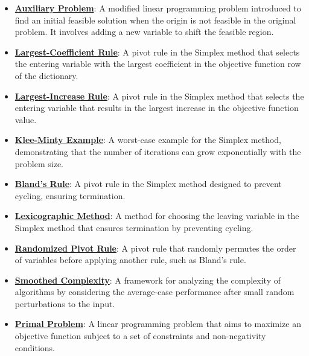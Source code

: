 \documentclass{article}%
\begin{document}
\begin{itemize}[leftmargin=*]
\item \href{https://www.math.purdue.edu/~yipn/421/2024-08-27-ExSimplex.pdf#page=32}{\textbf{Auxiliary Problem}}: A modified linear programming problem introduced to find an initial feasible solution when the origin is not feasible in the original problem. It involves adding a new variable to shift the feasible region.%
\item \href{https://www.math.purdue.edu/~yipn/421/2024-09-05-SimplexEfficiency.pdf#page=4}{\textbf{Largest-Coefficient Rule}}: A pivot rule in the Simplex method that selects the entering variable with the largest coefficient in the objective function row of the dictionary.%
\item \href{https://www.math.purdue.edu/~yipn/421/2024-09-05-SimplexEfficiency.pdf#page=6}{\textbf{Largest-Increase Rule}}: A pivot rule in the Simplex method that selects the entering variable that results in the largest increase in the objective function value.%
\item \href{https://www.math.purdue.edu/~yipn/421/2024-09-05-SimplexEfficiency.pdf#page=2}{\textbf{Klee-Minty Example}}: A worst-case example for the Simplex method, demonstrating that the number of iterations can grow exponentially with the problem size.%
\item \href{https://www.math.purdue.edu/~yipn/421/2024-09-05-SimplexEfficiency.pdf#page=10}{\textbf{Bland's Rule}}: A pivot rule in the Simplex method designed to prevent cycling, ensuring termination.%
\item \href{https://www.math.purdue.edu/~yipn/421/2024-09-05-SimplexEfficiency.pdf#page=10}{\textbf{Lexicographic Method}}: A method for choosing the leaving variable in the Simplex method that ensures termination by preventing cycling.%
\item \href{https://www.math.purdue.edu/~yipn/421/2024-09-05-SimplexEfficiency.pdf#page=10}{\textbf{Randomized Pivot Rule}}: A pivot rule that randomly permutes the order of variables before applying another rule, such as Bland's rule.%
\item \href{https://www.math.purdue.edu/~yipn/421/2024-09-05-SimplexEfficiency.pdf#page=11}{\textbf{Smoothed Complexity}}: A framework for analyzing the complexity of algorithms by considering the average-case performance after small random perturbations to the input.%
\item \href{https://www.math.purdue.edu/~yipn/421/2024-09-12-Duality.pdf#page=1}{\textbf{Primal Problem}}: A linear programming problem that aims to maximize an objective function subject to a set of constraints and non-negativity conditions.%

\end{itemize}
\end{document}
